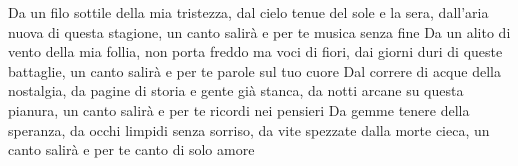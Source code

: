 \beginverse
Da un filo sottile della mia tristezza,
dal cielo tenue del sole e la sera,
dall'aria nuova di questa stagione,
un canto salirà e per te
musica senza fine
\endverse \beginverse
Da un alito di vento della mia follia,
non porta freddo ma voci di fiori,
dai giorni duri di queste battaglie,
un canto salirà e per te
parole sul tuo cuore
\endverse \beginverse
Dal correre di acque della nostalgia,
da pagine di storia e gente già stanca,
da notti arcane su questa pianura,
un canto salirà e per te
ricordi nei pensieri
\endverse \beginverse
Da gemme tenere della speranza,
da occhi limpidi senza sorriso,
da vite spezzate dalla morte cieca,
un canto salirà e per te
canto di solo amore
\endverse
\endsong
